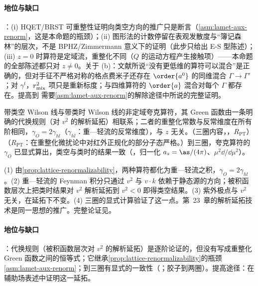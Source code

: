 \paragraph{地位与缺口}
\tagA：(i) HQET/BRST 可重整性证明向类空方向的推广只是断言（\cref{asm:lamet-aux-renorm}，这是本命题的瓶颈）；(ii) 图形法的计数停留在表观发散度与“簿记森林”的层次，不是 BPHZ/Zimmermann 意义下的证明（此步只给出 E-S 型陈述）；(iii) $z=0$ 时算符是定域流，重整化不同（$Q$ 的运动方程产生接触项）——本命题的全部陈述都只对 $z\neq0$。关于 (b)：文献\cite{Ji:2017oey}所说“没有更低维的算符可以混合”是正确的，但对手征不严格对称的格点费米子还存在 $\order{a^0}$ 的同维混合 $\Gamma\to\Gamma'$\cite{Green:2017xeu,Constantinou:2017sej,Chen:2017mie}；对 $\gamma^t$，$r_{\rm mix}^2$ 项只是重新标度；与四维算符的 $\order{a}$ 混合对每个 $\Gamma$ 都存在。提高到 \tagR 需要\cref{asm:lamet-aux-renorm}的解除途径中所说的完整证明。

\begin{proposition}\label{prop:lamet-ad-spacelike}
带类空 Wilson 线与带类时 Wilson 线的非定域夸克算符，其 Green 函数由一条明确的代换规则（对 $v^2$ 的解析延拓）相联系；二者的重整化常数与反常维度在所有阶相同，$\gamma_O=2\gamma_{hl}$（$\gamma_{hl}$：重—轻流的反常维度），与 $z$ 无关。（三圈内容，\tagR，$R_{\mathrm{PT}}$）（$R_{\mathrm{PT}}$：在重整化微扰论中对红外正规化的部分子态严格。）到三圈，夸克算符的 $\gamma_O$ 已显式算出，类空与类时的结果一致（\cite[附录~A]{Braun:2020ymy}，归一化 $a_s=\as/(4\pi)$、$\mu^2\dd/\dd\mu^2$）。
\end{proposition}

\begin{proofsketch}
(1) 由\cref{prop:lattice-renormalizability}，两种算符都化为重—轻流之积，$\gamma_O=2\gamma_{hl}$。(2) 重—轻流的 Feynman 积分只通过 $v^2$ 与 $v\cdot k$ 依赖于静态源的方向；被积函数层次上把类时结果对 $v^2$ 解析延拓到 $v^2<0$ 即得类空结果\cite{Braun:2020ymy}。(3) 紫外极点与 $v^2$ 无关，在延拓下不变。(4) 三圈的显式计算验证了这一点。第~23~章的解析延拓技术是同一思想的推广。完整论证见\cite{Braun:2020ymy}。
\end{proofsketch}

\paragraph{地位与缺口}
\tagA：代换规则（被积函数层次对 $v^2$ 的解析延拓）是逐阶论证的，但没有写成重整化 Green 函数之间的恒等式；它继承\cref{prop:lattice-renormalizability}的瓶颈\cref{asm:lamet-aux-renorm}；到三圈有显式的一致性（\cite[附录~A]{Braun:2020ymy}；胶子到两圈）。提高途径：在辅助场表述中证明这一延拓。

